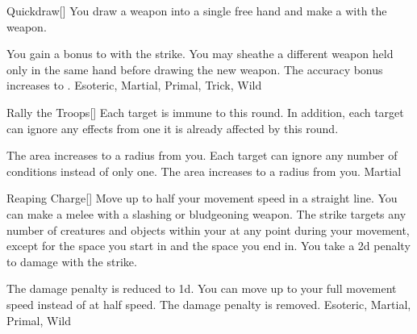 \lowercase{\hypertarget{maneuver:Quickdraw}{}}\label{maneuver:Quickdraw}
\hypertarget{maneuver:Quickdraw}{}
\begin{freeability}[Rank 1]{Quickdraw}[]
You draw a weapon into a single free hand and make a  with the weapon.

\rankline
{} You gain a  bonus to  with the strike.
 You may sheathe a different weapon held only in the same hand before drawing the new weapon.
 The accuracy bonus increases to .
 Esoteric, Martial, Primal, Trick, Wild
\end{freeability}
\vspace{0.25em}



\lowercase{\hypertarget{maneuver:Rally the Troops}{}}\label{maneuver:Rally the Troops}
\hypertarget{maneuver:Rally the Troops}{}
\begin{freeability}[Rank 1]{Rally the Troops}[]
Each target is immune to  this round.
In addition, each target can ignore any effects from one  it is already affected by this round.

\rankline
{} The area increases to a \arealarge radius from you.
 Each target can ignore any number of conditions instead of only one.
 The area increases to a \areahuge radius from you.
 Martial
\end{freeability}
\vspace{0.25em}



\lowercase{\hypertarget{maneuver:Reaping Charge}{}}\label{maneuver:Reaping Charge}
\hypertarget{maneuver:Reaping Charge}{}
\begin{freeability}[Rank 1]{Reaping Charge}[]
Move up to half your movement speed in a straight line.
You can make a melee  with a slashing or bludgeoning weapon.
The strike targets any number of creatures and objects within your  at any point during your movement, except for the space you start in and the space you end in.
You take a \minus2d penalty to damage with the strike.

\rankline
{} The damage penalty is reduced to \minus1d.
 You can move up to your full movement speed instead of at half speed.
 The damage penalty is removed.
 Esoteric, Martial, Primal, Wild
\end{freeability}
\vspace{0.25em}



